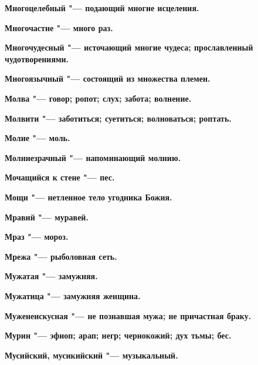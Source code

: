 \bfseries Многоцелебный \normalfont{} "--- подающий многие исцеления. 




\bfseries Многочастне \normalfont{} "--- много раз. 




\bfseries Многочудесный \normalfont{} "--- источающий многие чудеса; прославленный чудотворениями. 




\bfseries Многоязычный \normalfont{} "--- состоящий из множества племен. 




\bfseries Молва \normalfont{} "--- говор; ропот; слух; забота; волнение. 




\bfseries Молвити \normalfont{} "--- заботиться; суетиться; волноваться; роптать. 




\bfseries Молие \normalfont{} "--- моль. 




\bfseries Молниезрачный \normalfont{} "--- напоминающий молнию. 




\bfseries Мочащийся к стене \normalfont{} "--- пес. 




\bfseries Мощи \normalfont{} "--- нетленное тело угодника Божия. 




\bfseries Мравий \normalfont{} "--- муравей. 




\bfseries Мраз \normalfont{} "--- мороз. 




\bfseries Мрежа \normalfont{} "--- рыболовная сеть. 




\bfseries Мужатая \normalfont{} "--- замужняя. 




\bfseries Мужатица \normalfont{} "--- замужняя женщина. 




\bfseries Муженеискусная \normalfont{} "--- не познавшая мужа; не причастная браку. 




\bfseries Мурин \normalfont{} "--- эфиоп; арап; негр; чернокожий; дух тьмы; бес. 




\bfseries Мусийский, мусикийский \normalfont{} "--- музыкальный. 




